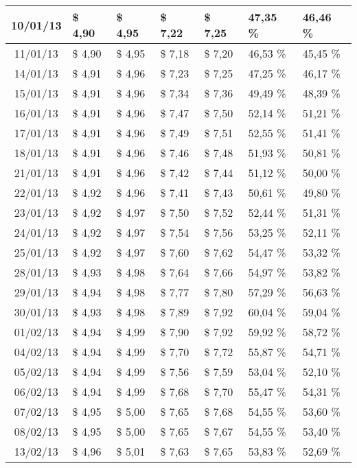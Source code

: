 \begin{center}
\begin{longtable}{|c|p{1.5cm}|p{1.5cm}|p{1.5cm}|p{1.5cm}|p{1.5cm}|p{1.5cm}|}
10/01/13 & \$ 4,90 & \$ 4,95 & \$ 7,22 & \$ 7,25 & 47,35 \% & 46,46 \% \\ \hline
11/01/13 & \$ 4,90 & \$ 4,95 & \$ 7,18 & \$ 7,20 & 46,53 \% & 45,45 \% \\ \hline
14/01/13 & \$ 4,91 & \$ 4,96 & \$ 7,23 & \$ 7,25 & 47,25 \% & 46,17 \% \\ \hline
15/01/13 & \$ 4,91 & \$ 4,96 & \$ 7,34 & \$ 7,36 & 49,49 \% & 48,39 \% \\ \hline
16/01/13 & \$ 4,91 & \$ 4,96 & \$ 7,47 & \$ 7,50 & 52,14 \% & 51,21 \% \\ \hline
17/01/13 & \$ 4,91 & \$ 4,96 & \$ 7,49 & \$ 7,51 & 52,55 \% & 51,41 \% \\ \hline
18/01/13 & \$ 4,91 & \$ 4,96 & \$ 7,46 & \$ 7,48 & 51,93 \% & 50,81 \% \\ \hline
21/01/13 & \$ 4,91 & \$ 4,96 & \$ 7,42 & \$ 7,44 & 51,12 \% & 50,00 \% \\ \hline
22/01/13 & \$ 4,92 & \$ 4,96 & \$ 7,41 & \$ 7,43 & 50,61 \% & 49,80 \% \\ \hline
23/01/13 & \$ 4,92 & \$ 4,97 & \$ 7,50 & \$ 7,52 & 52,44 \% & 51,31 \% \\ \hline
24/01/13 & \$ 4,92 & \$ 4,97 & \$ 7,54 & \$ 7,56 & 53,25 \% & 52,11 \% \\ \hline
25/01/13 & \$ 4,92 & \$ 4,97 & \$ 7,60 & \$ 7,62 & 54,47 \% & 53,32 \% \\ \hline
28/01/13 & \$ 4,93 & \$ 4,98 & \$ 7,64 & \$ 7,66 & 54,97 \% & 53,82 \% \\ \hline
29/01/13 & \$ 4,94 & \$ 4,98 & \$ 7,77 & \$ 7,80 & 57,29 \% & 56,63 \% \\ \hline
30/01/13 & \$ 4,93 & \$ 4,98 & \$ 7,89 & \$ 7,92 & 60,04 \% & 59,04 \% \\ \hline
01/02/13 & \$ 4,94 & \$ 4,99 & \$ 7,90 & \$ 7,92 & 59,92 \% & 58,72 \% \\ \hline
04/02/13 & \$ 4,94 & \$ 4,99 & \$ 7,70 & \$ 7,72 & 55,87 \% & 54,71 \% \\ \hline
05/02/13 & \$ 4,94 & \$ 4,99 & \$ 7,56 & \$ 7,59 & 53,04 \% & 52,10 \% \\ \hline
06/02/13 & \$ 4,94 & \$ 4,99 & \$ 7,68 & \$ 7,70 & 55,47 \% & 54,31 \% \\ \hline
07/02/13 & \$ 4,95 & \$ 5,00 & \$ 7,65 & \$ 7,68 & 54,55 \% & 53,60 \% \\ \hline
08/02/13 & \$ 4,95 & \$ 5,00 & \$ 7,65 & \$ 7,67 & 54,55 \% & 53,40 \% \\ \hline
13/02/13 & \$ 4,96 & \$ 5,01 & \$ 7,63 & \$ 7,65 & 53,83 \% & 52,69 \% \\ \hline

\end{longtable}
\end{center}
